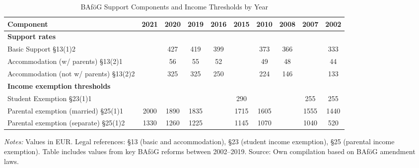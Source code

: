 \begin{table}[H]
\centering
\scriptsize
\begin{tabular}{p{5.5cm}ccccccccc}
\toprule
\textbf{Component} & 2021 & 2020 & 2019 & 2016 & 2015 & 2010 & 2008 & 2007 & 2002 \\
\midrule
\textbf{Support rates} \\

Basic Support §13(1)2                         &       & 427 & 419 & 399 &       & 373 & 366 &       & 333 \\
Accommodation (w/ parents) §13(2)1            &       & 56  & 55  & 52  &       & 49  & 48  &       & 44  \\
Accommodation (not w/ parents) §13(2)2        &       & 325 & 325 & 250 &       & 224 & 146 &       & 133 \\
\textbf{Income exemption thresholds} \\
Student Exemption §23(1)1                     &       &     &     &     & 290   &     &     & 255   & 255 \\
Parental exemption (married) §25(1)1          & 2000  & 1890& 1835&     & 1715  & 1605&     & 1555  & 1440 \\
Parental exemption (separate) §25(1)2         & 1330  & 1260& 1225&     & 1145  & 1070&     & 1040  & 520  \\
\bottomrule
\end{tabular}
\caption{BAföG Support Components and Income Thresholds by Year}
\begin{tablenotes}
\small
\item \textit{Notes:} Values in EUR. Legal references: §13 (basic and accommodation), §23 (student income exemption), §25 (parental income exemption). Table includes values from key BAföG reforms between 2002–2019. Source: Own compilation based on BAföG amendment laws.
\end{tablenotes}
\label{tab:bafoeg_components}
\end{table}
